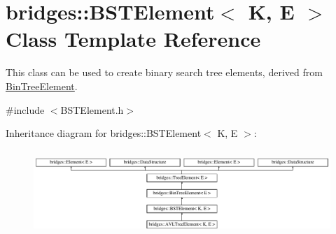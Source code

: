 \hypertarget{classbridges_1_1_b_s_t_element}{}\section{bridges\+:\+:B\+S\+T\+Element$<$ K, E $>$ Class Template Reference}
\label{classbridges_1_1_b_s_t_element}


This class can be used to create binary search tree elements, derived from \hyperlink{classbridges_1_1_bin_tree_element}{Bin\+Tree\+Element}.  




{\ttfamily \#include $<$B\+S\+T\+Element.\+h$>$}

Inheritance diagram for bridges\+:\+:B\+S\+T\+Element$<$ K, E $>$\+:\begin{figure}[H]
\begin{center}
\leavevmode
\includegraphics[height=3.301887cm]{classbridges_1_1_b_s_t_element}
\end{center}
\end{figure}
